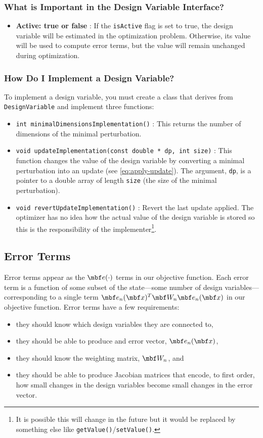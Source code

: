 \documentclass[11pt,a4,oneside]{article}
\newcommand{\txt}[1]{{\footnotesize\texttt{#1}}}
\newcommand{\listcpp}[2]{}
\begin{document}
\subsubsection{What is Important in the Design Variable Interface?}
\begin{itemize}
\item {\bf Active: true or false} : If the \txt{isActive} flag is set to true, the design variable will be estimated in the optimization problem. Otherwise, its value will be used to compute error terms, but the value will remain unchanged during optimization.
\end{itemize}
\subsubsection{How Do I Implement a Design Variable?}
To implement a design variable, you must create a class that derives from \txt{DesignVariable} and implement three functions:
\begin{itemize}
\item \txt{int minimalDimensionsImplementation()} : This returns the number of dimensions of the minimal perturbation.
\item \txt{void updateImplementation(const double * dp, int size)} : This function changes the value of the design variable by converting a minimal perturbation into an update (see \eqref{eq:apply-update}). The argument, \txt{dp}, is a pointer to a double array of length \txt{size} (the size of the minimal perturbation).
\item \txt{void revertUpdateImplementation()} : Revert the last update applied. The optimizer has no idea how the actual value of the design variable is stored so this is the responsibility of the implementer\footnote{It is possible this will change in the future but it would be replaced by something else like \txt{getValue()}/\txt{setValue()}.}.
\end{itemize}
\subsection{Error Terms \label{ss:ErrorTerm}}
Error terms appear as the $\mbf e(\cdot)$ terms in our objective function. Each error term is a function of some subset of the state---some number of design variables---corresponding to a single term $\mbf e_{n}(\mbf x)^T \mbf W_n \mbf e_n(\mbf x)$ in our objective function. Error terms have a few requirements:
\begin{itemize}
\item they should know which design variables they are connected to,
\item they should be able to produce and error vector, $\mbf e_n(\mbf x)$, 
\item they should know the weighting matrix, $\mbf W_n$, and
\item they should be able to produce Jacobian matrices that encode, to first order, how small changes in the design variables become small changes in the error vector.  
\end{itemize}
\listcpp{ErrorTerm.hpp}{../../aslam_backend/include/aslam/backend/ErrorTerm.hpp}
\end{document}
